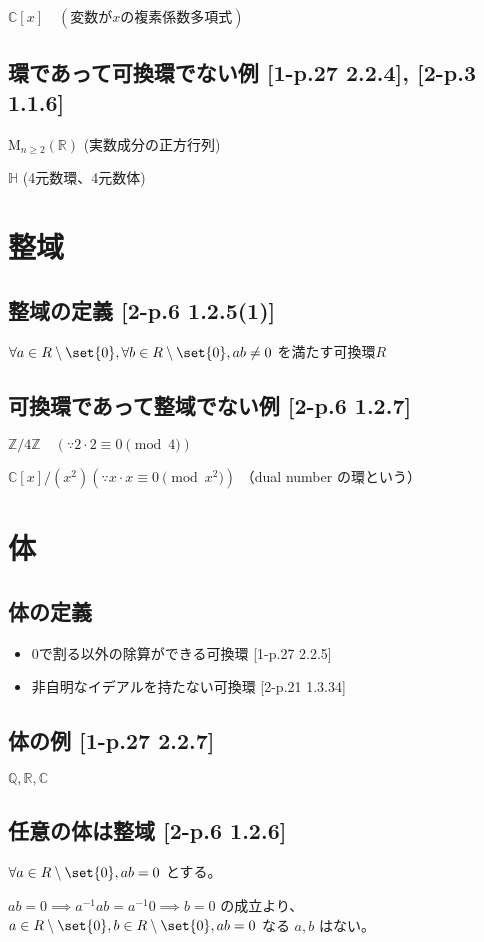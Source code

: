 \documentclass[twocolumn]{jsarticle}
\newcommand{\Z}{\mathbb{Z}}
\newcommand{\R}{\mathbb{R}}
\newcommand{\C}{\mathbb{C}}
\newcommand{\inv}[1]{#1^{-1}}
\begin{document}
\(\C[x] \quad(変数がxの複素係数多項式)\)
\subsection{環であって可換環でない例 [1-p.27 2.2.4], [2-p.3 1.1.6]}
\(\mathrm{M}_{n\geq2}(\R)\) (実数成分の正方行列)

\(\mathbb{H}\) (4元数環、4元数体)

\section{整域}
\subsection{整域の定義 [2-p.6 1.2.5(1)]}
\(
\forall a \in R\setminus\set{0}, \forall b \in R\setminus\set{0}, ab \neq 0
\)
を満たす可換環\(R\)
\subsection{可換環であって整域でない例 [2-p.6 1.2.7]}
\(\Z/4\Z \quad(\because 2\cdot2\equiv 0 \pmod{4})\)

\(\C[x]/(x^2)(\because x\cdot x\equiv 0 \pmod{x^2})\) （dual number の環という）

\section{体}
\subsection{体の定義}
\begin{itemize}
    \item 0で割る以外の除算ができる可換環 [1-p.27 2.2.5]
    \item 非自明なイデアルを持たない可換環 [2-p.21 1.3.34]
\end{itemize}
\subsection{体の例 [1-p.27 2.2.7]}
\(\mathbb{Q}, \R, \C\)

\subsection{任意の体は整域 [2-p.6 1.2.6]}
\(
\forall a \in R\setminus\set{0},  ab = 0
\)
とする。

\(ab=0 \implies \inv{a}ab = \inv{a}0 \implies b = 0\)
の成立より、
\(
a \in R\setminus\set{0}, b \in R\setminus\set{0}, ab = 0
\)
なる \(a, b\) はない。
\end{document}
